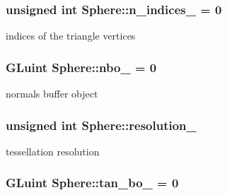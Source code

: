 \subsubsection[{\texorpdfstring{n\+\_\+indices\+\_\+}{n_indices_}}]{\setlength{\rightskip}{0pt plus 5cm}unsigned int Sphere\+::n\+\_\+indices\+\_\+ = 0\hspace{0.3cm}{\ttfamily [private]}}\hypertarget{classSphere_a02c9c6431fbc42d50ed697fa01f454ca}{}\label{classSphere_a02c9c6431fbc42d50ed697fa01f454ca}


indices of the triangle vertices 

\subsubsection[{\texorpdfstring{nbo\+\_\+}{nbo_}}]{\setlength{\rightskip}{0pt plus 5cm}G\+Luint Sphere\+::nbo\+\_\+ = 0\hspace{0.3cm}{\ttfamily [private]}}\hypertarget{classSphere_a9b6246e4e88fcf9f17d4e0e6a7cbd74d}{}\label{classSphere_a9b6246e4e88fcf9f17d4e0e6a7cbd74d}


normals buffer object 

\subsubsection[{\texorpdfstring{resolution\+\_\+}{resolution_}}]{\setlength{\rightskip}{0pt plus 5cm}unsigned int Sphere\+::resolution\+\_\+\hspace{0.3cm}{\ttfamily [private]}}\hypertarget{classSphere_a6d3defa9cb5c35aa6dfb16e60be375b2}{}\label{classSphere_a6d3defa9cb5c35aa6dfb16e60be375b2}


tessellation resolution 

\subsubsection[{\texorpdfstring{tan\+\_\+bo\+\_\+}{tan_bo_}}]{\setlength{\rightskip}{0pt plus 5cm}G\+Luint Sphere\+::tan\+\_\+bo\+\_\+ = 0\hspace{0.3cm}{\ttfamily [private]}}\hypertarget{classSphere_a558372e8833a6cccc087c05bd53b318d}{}\label{classSphere_a558372e8833a6cccc087c05bd53b318d}


